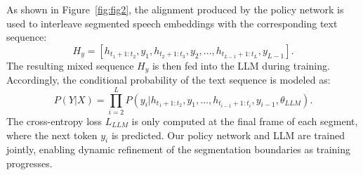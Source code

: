 \documentclass{article}
\begin{document}
As shown in Figure~\ref{fig:fig2}, the alignment produced by the policy network is used to interleave segmented speech embeddings with the corresponding text sequence:
\begin{equation}
H_y = [ h_{t_1+1:t_2}, y_1, h_{t_2+1:t_3}, y_2, \dots, h_{t_{L-1}+1:t_{L}}, y_{L-1} ] .
\end{equation}
The resulting mixed sequence $H_y$ is then fed into the LLM during training.
Accordingly, the conditional probability of the text sequence is modeled as:
\begin{equation}
P(Y|X) = \prod_{i=2}^{L} P(y_{i} | h_{t_1+1:t_2}, y_1, \dots, h_{t_{i-1}+1:t_i},  y_{i-1}, \theta_{LLM}) .
\end{equation}
The cross-entropy loss $L_{LLM}$ is only computed at the final frame of each segment, where the next token $y_i$ is predicted.
Our policy network and LLM are trained jointly, enabling dynamic refinement of the segmentation boundaries as training progresses.


\end{document}
